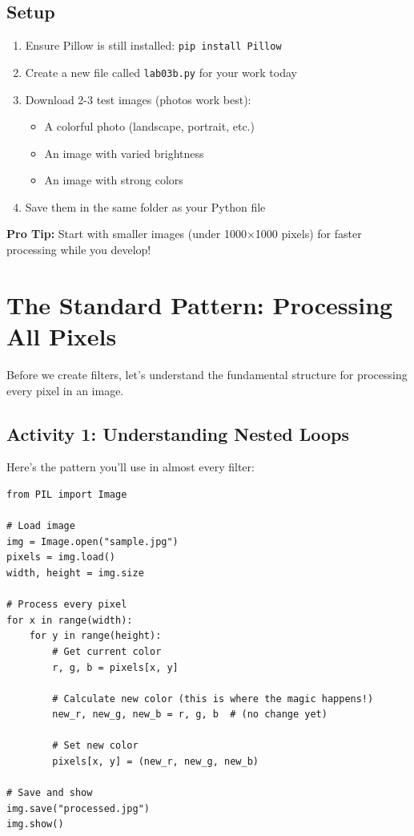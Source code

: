 \documentclass[11pt]{article}
\begin{document}
\subsection*{Setup}

\begin{enumerate}
    \item Ensure Pillow is still installed: \texttt{pip install Pillow}
    \item Create a new file called \texttt{lab03b.py} for your work today
    \item Download 2-3 test images (photos work best):
    \begin{itemize}
        \item A colorful photo (landscape, portrait, etc.)
        \item An image with varied brightness
        \item An image with strong colors
    \end{itemize}
    \item Save them in the same folder as your Python file
\end{enumerate}

\textbf{Pro Tip:} Start with smaller images (under 1000×1000 pixels) for faster processing while you develop!

\section{The Standard Pattern: Processing All Pixels}

Before we create filters, let's understand the fundamental structure for processing every pixel in an image.

\subsection*{Activity 1: Understanding Nested Loops}

Here's the pattern you'll use in almost every filter:

\begin{lstlisting}
from PIL import Image

# Load image
img = Image.open("sample.jpg")
pixels = img.load()
width, height = img.size

# Process every pixel
for x in range(width):
    for y in range(height):
        # Get current color
        r, g, b = pixels[x, y]

        # Calculate new color (this is where the magic happens!)
        new_r, new_g, new_b = r, g, b  # (no change yet)

        # Set new color
        pixels[x, y] = (new_r, new_g, new_b)

# Save and show
img.save("processed.jpg")
img.show()
\end{lstlisting}
\end{document}
